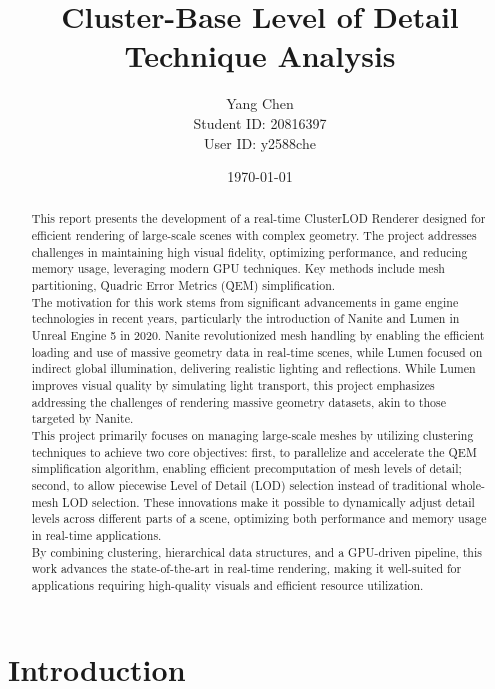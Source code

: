 \documentclass[12pt]{extarticle}
\title{Cluster-Base Level of Detail Technique Analysis}
\author{Yang Chen \\ Student ID: 20816397 \\ User ID: y2588che}
\date{\today}
\newcommand{\customnewline}{\\[1.5em]}
\begin{document}
\maketitle
\newpage

\begin{abstract}
This report presents the development of a real-time ClusterLOD Renderer designed for efficient rendering of large-scale scenes 
with complex geometry. The project addresses challenges in maintaining high visual fidelity, optimizing performance, and 
reducing memory usage, leveraging modern GPU techniques. Key methods include mesh partitioning, Quadric Error Metrics (QEM) simplification.
\customnewline
The motivation for this work stems from significant advancements in game engine technologies in recent years, particularly the 
introduction of Nanite and Lumen in Unreal Engine 5 in 2020. Nanite revolutionized mesh handling by enabling the efficient 
loading and use of massive geometry data in real-time scenes, while Lumen focused on indirect global illumination, delivering 
realistic lighting and reflections. While Lumen improves visual quality by simulating light transport, this project emphasizes 
addressing the challenges of rendering massive geometry datasets, akin to those targeted by Nanite.
\customnewline
This project primarily focuses on managing large-scale meshes by utilizing clustering techniques to achieve two core objectives:
first, to parallelize and accelerate the QEM simplification algorithm, enabling efficient precomputation of mesh levels of 
detail; second, to allow piecewise Level of Detail (LOD) selection instead of traditional whole-mesh LOD selection. These 
innovations make it possible to dynamically adjust detail levels across different parts of a scene, optimizing both performance 
and memory usage in real-time applications.
\customnewline
By combining clustering, hierarchical data structures, and a GPU-driven pipeline, this work advances the state-of-the-art in 
real-time rendering, making it well-suited for applications requiring high-quality visuals and efficient resource utilization.
\end{abstract}

\newpage

\tableofcontents
\newpage

\section{Introduction}
\end{document}
